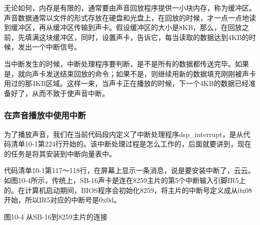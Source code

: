 \documentclass[12pt]{article}
\begin{document}
\begin{CJK}{UTF8}{gbsn}
无论如何，内存是有限的，通常要由声音回放程序提供一小块内存，称为缓冲区。声音数据通常以文件的形式存放在硬盘和光盘上，在回放的时候，才一点一点地读到缓冲区，再从缓冲区传输到声卡。假设缓冲区的大小是8KB，那么，在回放之前，先填满这块缓冲区，同时，设置声卡，告诉它，每当读取的数据达到4KB的时候，发出一个中断信号。

当中断发生的时候，中断处理程序要判断，是不是所有的数据都传送完毕。如果是，就向声卡发送结束回放的命令；如果不是，则继续用新的数据填充刚刚被声卡用过的那4KB区域。这样一来，当声卡正在播放的时候，下一个4KB的数据已经准备好了，从而不致于使声音中断。

\subsubsection{在声音播放中使用中断}
为了播放声音，我们在当前代码段内定义了中断处理程序dsp\_{}interrupt，是从代码清单10-1第224行开始的。该中断处理过程是怎么工作的，后面就要讲到，现在的任务是将其安装到中断向量表中。

代码清单10-1第117～118行，在屏幕上显示一条消息，说是要安装中断了，云云。如图10-4所示，传统上，SB-16声卡是连在8259主片的第5个中断输入引脚IR5上的。在计算机启动期间，BIOS程序会初始化8259，将主片的中断号定义成从0x08开始，所以IR5对应的中断号是0x0d。
 
图10-4  从SB-16到8259主片的连接

\begin{comment}
第120～123行，和以前一样，把中断号乘以4，就得到了它在中断向量表中的登记项。事实上，因为将一个二进制数逻辑左移2次就相当于乘以4，所以这几句等效于
mov bx,0x0d
shl bx,2
不过，这样一来，指令的功能和意图就显得不是那么明显了。
第125行，在修改中断向量表的时候，要禁止外部中断。
第127～137行，先将段寄存器ES压栈保存，再使它指向逻辑段0x0000，这是中断向量表所在的段。接着，用新的段地址和偏移地址修改0x0d号中断的登记项。0x0d号中断所在的登记项，其偏移地址已经位于寄存器BX中；新的0x0d号中断处理过程位于当前代码段，段地址自然由段寄存器CS提供，偏移地址就是标号dsp\_{}interrupt的汇编地址。当然，最后还要从堆栈中恢复段寄存器ES的内容。
第137行，开放外部中断。
既然中断处理过程的入口地址已经安装停当，第140～142行，修改8259主片的中断屏蔽寄存器，使其第5位为“0”，意思是允许中断信号进入，同时保持其它位不变。这几句执行之后，来自声卡的中断请求将会被8259接受。
第144～145行，显示一条信息，提示中断处理过程已经安装好了。
10.4  DMA控制器的结构、功能和初始化
10.4.1  个人计算机中的DMA控制器
如图10-5所示，在二十年前，个人计算机系统的组成大致就是这个样子。那个时候，已经有了集成外围芯片，内部集成了8259、RTC/CMOS RAM、DMA控制器、定时器/计数器、串/并行通信器、键盘控制器等，但并不如现在的ICH智能。
 

\end{comment}
\end{CJK}
\end{document}
